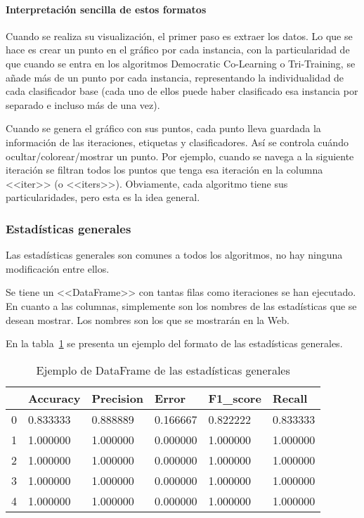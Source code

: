 \paragraph{Interpretación sencilla de estos formatos} Cuando se realiza su
visualización, el primer paso es extraer los datos. Lo que se hace es crear un
punto en el gráfico por cada instancia, con la particularidad de que cuando se
entra en los algoritmos Democratic Co-Learning o Tri-Training, se añade más de
un punto por cada instancia, representando la individualidad de cada
clasificador base (cada uno de ellos puede haber clasificado esa instancia por
separado e incluso más de una vez).

Cuando se genera el gráfico con sus puntos, cada punto lleva guardada la
información de las iteraciones, etiquetas y clasificadores. Así se controla
cuándo ocultar/colorear/mostrar un punto. Por ejemplo, cuando se navega a la
siguiente iteración se filtran todos los puntos que tenga esa iteración en la
columna <<iter>> (o <<iters>>). Obviamente, cada algoritmo tiene sus
particularidades, pero esta es la idea general.

\subsubsection{Estadísticas generales}
Las estadísticas generales son comunes a todos los algoritmos, no hay ninguna
modificación entre ellos.

Se tiene un <<DataFrame>> con tantas filas como iteraciones se han ejecutado. En
cuanto a las columnas, simplemente son los nombres de las estadísticas que se
desean mostrar. Los nombres son los que se mostrarán en la Web.

En la tabla~\ref{tabla:dataframe-generales} se presenta un ejemplo del formato
de las estadísticas generales.
\begin{table}
\centering
\begin{tabular}{llllll}
  & Accuracy  & Precision & Error    & F1\_score & Recall    \\ \hline
0 & 0.833333  & 0.888889  & 0.166667 & 0.822222  & 0.833333  \\
1 & 1.000000 & 1.000000 & 0.000000 & 1.000000 & 1.000000 \\
2 & 1.000000 & 1.000000 & 0.000000 & 1.000000 & 1.000000 \\
3 & 1.000000 & 1.000000 & 0.000000 & 1.000000 & 1.000000 \\
4 & 1.000000 & 1.000000 & 0.000000 & 1.000000 & 1.000000
\end{tabular}
\caption{Ejemplo de DataFrame de las estadísticas generales}
\label{tabla:dataframe-generales}
\end{table}

